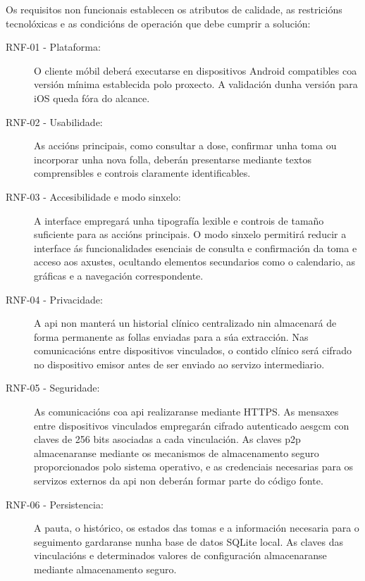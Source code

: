 Os requisitos non funcionais establecen os atributos de calidade, as restricións tecnolóxicas e as condicións de operación que debe cumprir a solución:

\begin{description}


\item[RNF-01 - Plataforma:] O cliente móbil deberá executarse en dispositivos Android compatibles coa versión mínima establecida polo proxecto. A validación dunha versión para iOS queda fóra do alcance.

\item[RNF-02 - Usabilidade:] As accións principais, como consultar a dose, confirmar unha toma ou incorporar unha nova folla, deberán presentarse mediante textos comprensibles e controis claramente identificables.

\item[RNF-03 - Accesibilidade e modo sinxelo:] A interface empregará unha tipografía lexible e controis de tamaño suficiente para as accións principais. O modo sinxelo permitirá reducir a interface ás funcionalidades esenciais de consulta e confirmación da toma e acceso aos axustes, ocultando elementos secundarios como o calendario, as gráficas e a navegación correspondente.

\item[RNF-04 - Privacidade:] A \gls{api} non manterá un historial clínico centralizado nin almacenará de forma permanente as follas enviadas para a súa extracción. Nas comunicacións entre dispositivos vinculados, o contido clínico será cifrado no dispositivo emisor antes de ser enviado ao servizo intermediario.

\item[RNF-05 - Seguridade:] As comunicacións coa \gls{api} realizaranse mediante HTTPS. As mensaxes entre dispositivos vinculados empregarán cifrado autenticado \gls{aesgcm} con claves de 256 bits asociadas a cada vinculación. As claves \gls{p2p} almacenaranse mediante os mecanismos de almacenamento seguro proporcionados polo sistema operativo, e as credenciais necesarias para os servizos externos da \gls{api} non deberán formar parte do código fonte.

\item[RNF-06 - Persistencia:] A pauta, o histórico, os estados das tomas e a información necesaria para o seguimento gardaranse nunha base de datos SQLite local. As claves das vinculacións e determinados valores de configuración almacenaranse mediante almacenamento seguro.


\end{description}
